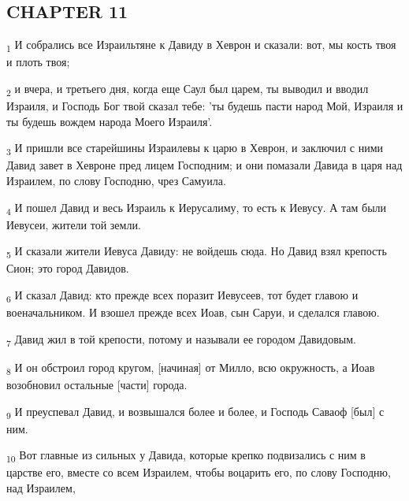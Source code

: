 \subsection{CHAPTER 11}
\begin{tcolorbox}
\textsubscript{1} И собрались все Израильтяне к Давиду в Хеврон и сказали: вот, мы кость твоя и плоть твоя;
\end{tcolorbox}
\begin{tcolorbox}
\textsubscript{2} и вчера, и третьего дня, когда еще Саул был царем, ты выводил и вводил Израиля, и Господь Бог твой сказал тебе: 'ты будешь пасти народ Мой, Израиля и ты будешь вождем народа Моего Израиля'.
\end{tcolorbox}
\begin{tcolorbox}
\textsubscript{3} И пришли все старейшины Израилевы к царю в Хеврон, и заключил с ними Давид завет в Хевроне пред лицем Господним; и они помазали Давида в царя над Израилем, по слову Господню, чрез Самуила.
\end{tcolorbox}
\begin{tcolorbox}
\textsubscript{4} И пошел Давид и весь Израиль к Иерусалиму, то есть к Иевусу. А там были Иевусеи, жители той земли.
\end{tcolorbox}
\begin{tcolorbox}
\textsubscript{5} И сказали жители Иевуса Давиду: не войдешь сюда. Но Давид взял крепость Сион; это город Давидов.
\end{tcolorbox}
\begin{tcolorbox}
\textsubscript{6} И сказал Давид: кто прежде всех поразит Иевусеев, тот будет главою и военачальником. И взошел прежде всех Иоав, сын Саруи, и сделался главою.
\end{tcolorbox}
\begin{tcolorbox}
\textsubscript{7} Давид жил в той крепости, потому и называли ее городом Давидовым.
\end{tcolorbox}
\begin{tcolorbox}
\textsubscript{8} И он обстроил город кругом, [начиная] от Милло, всю окружность, а Иоав возобновил остальные [части] города.
\end{tcolorbox}
\begin{tcolorbox}
\textsubscript{9} И преуспевал Давид, и возвышался более и более, и Господь Саваоф [был] с ним.
\end{tcolorbox}
\begin{tcolorbox}
\textsubscript{10} Вот главные из сильных у Давида, которые крепко подвизались с ним в царстве его, вместе со всем Израилем, чтобы воцарить его, по слову Господню, над Израилем,
\end{tcolorbox}
